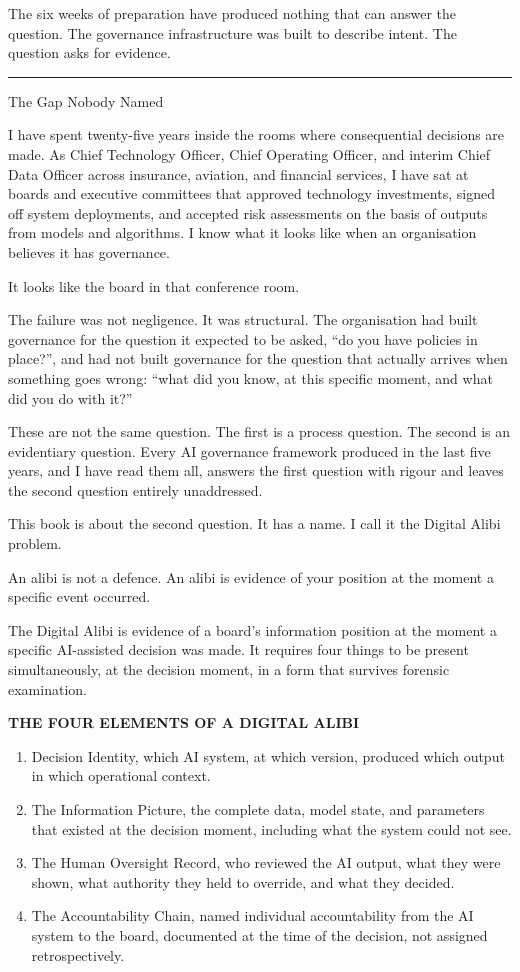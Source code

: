 The six weeks of preparation have produced nothing that can answer the question. The governance infrastructure was built to describe intent. The question asks for evidence.

\begin{center}\rule{0.5\linewidth}{0.5pt}\end{center}

The Gap Nobody Named

I have spent twenty-five years inside the rooms where consequential decisions are made. As Chief Technology Officer, Chief Operating Officer, and interim Chief Data Officer across insurance, aviation, and financial services, I have sat at boards and executive committees that approved technology investments, signed off system deployments, and accepted risk assessments on the basis of outputs from models and algorithms. I know what it looks like when an organisation believes it has governance.

It looks like the board in that conference room.

The failure was not negligence. It was structural. The organisation had built governance for the question it expected to be asked, ``do you have policies in place?'', and had not built governance for the question that actually arrives when something goes wrong: ``what did you know, at this specific moment, and what did you do with it?''

These are not the same question. The first is a process question. The second is an evidentiary question. Every AI governance framework produced in the last five years, and I have read them all, answers the first question with rigour and leaves the second question entirely unaddressed.

This book is about the second question. It has a name. I call it the Digital Alibi problem.

An alibi is not a defence. An alibi is evidence of your position at the moment a specific event occurred.

The Digital Alibi is evidence of a board's information position at the moment a specific AI-assisted decision was made. It requires four things to be present simultaneously, at the decision moment, in a form that survives forensic examination.

\textbf{THE FOUR ELEMENTS OF A DIGITAL ALIBI}

\begin{enumerate}
\def\labelenumi{\arabic{enumi}.}
\tightlist
\item
  Decision Identity, which AI system, at which version, produced which output in which operational context.
\item
  The Information Picture, the complete data, model state, and parameters that existed at the decision moment, including what the system could not see.
\item
  The Human Oversight Record, who reviewed the AI output, what they were shown, what authority they held to override, and what they decided.
\item
  The Accountability Chain, named individual accountability from the AI system to the board, documented at the time of the decision, not assigned retrospectively.
\end{enumerate}

